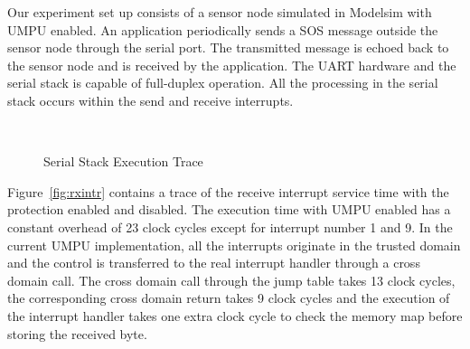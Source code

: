 Our experiment set up consists of a sensor node simulated in Modelsim
with UMPU enabled.
%
An application periodically sends a SOS message outside the
sensor node through the serial port.
%
The transmitted message is echoed back to the sensor node and is
received by the application.
%
The UART hardware and the serial stack is capable of full-duplex
operation.
%
All the processing in the serial stack occurs within the send and
receive interrupts.
%
%
\begin{figure}[htpb]
  \label{fig:intrtrace}
  \centering
  \mbox{
    \hspace{0.2in}
  }
  \caption{Serial Stack Execution Trace}
\end{figure}   
%

Figure~\ref{fig:rxintr} contains a trace of the receive interrupt
service time with the protection enabled and disabled.
%
The execution time with UMPU enabled has a constant overhead of 23 clock
cycles except for interrupt number 1 and 9.
%
In the current UMPU implementation, all the interrupts originate in
the trusted domain and the control is transferred to the real
interrupt handler through a cross domain call.
%
The cross domain call through the jump table takes 13 clock cycles,
the corresponding cross domain return takes 9 clock cycles and the
execution of the interrupt handler takes one extra clock cycle to
check the memory map before storing the received byte.
%

